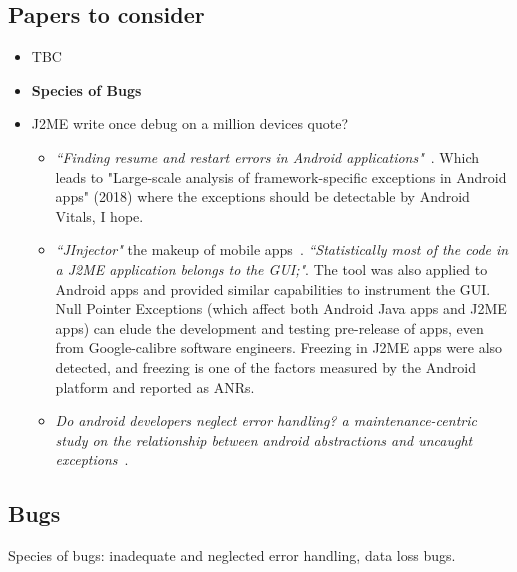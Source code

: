 \subsection{Papers to consider}
\begin{itemize}
    \item TBC
    \item \textbf{Species of Bugs}
    \item J2ME write once debug on a million devices quote?
    \begin{itemize}
        \item \emph{``Finding resume and restart errors in Android applications"}~\cite{shan2016finding}. Which leads to "Large-scale analysis of framework-specific exceptions in Android apps" (2018) where the exceptions should be detectable by Android Vitals, I hope.
        \item \emph{``JInjector"} the makeup of mobile apps~\citep{sama2009using_jinjector}. \emph{``Statistically most of the code in a J2ME application belongs to the GUI;"}. The tool was also applied to Android apps and provided similar capabilities to instrument the GUI. Null Pointer Exceptions (which affect both Android Java apps and J2ME apps) can elude the development and testing pre-release of apps, even from Google-calibre software engineers. Freezing in J2ME apps were also detected, and freezing is one of the factors measured by the Android platform and reported as ANRs.
        \item \emph{Do android developers neglect error handling? a maintenance-centric study on the relationship between android abstractions and uncaught exceptions}~\citep{Oliveira_Borges_Silva_Cacho_Castor_2018_android_error_handling}.
    \end{itemize}
\end{itemize}




\subsection{Bugs}
Species of bugs: inadequate and neglected error handling, data loss bugs.

